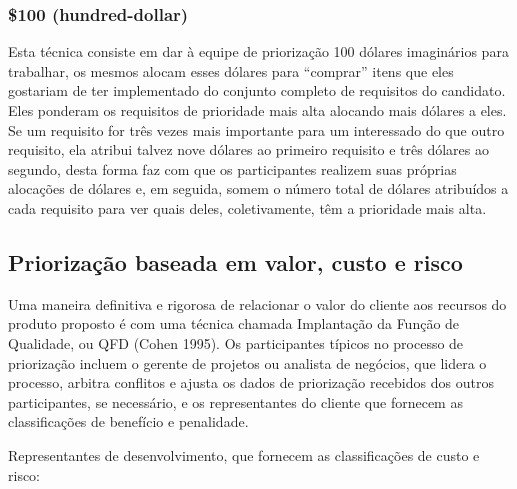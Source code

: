 \documentclass[runningheads]{llncs}
\begin{document}
\subsubsection{\$100 (hundred-dollar)}
Esta técnica consiste em dar à equipe de priorização 100 dólares imaginários para trabalhar, os mesmos alocam esses dólares para “comprar” itens que eles gostariam de ter implementado do conjunto completo de requisitos do candidato. Eles ponderam os requisitos de prioridade mais alta alocando mais dólares a eles. Se um requisito for três vezes mais importante para um interessado do que outro requisito, ela atribui talvez nove dólares ao primeiro requisito e três dólares ao segundo, desta forma faz com que os participantes realizem suas próprias alocações de dólares e, em seguida, somem o número total de dólares atribuídos a cada requisito para ver quais deles, coletivamente, têm a prioridade mais alta.

\subsection{Priorização baseada em valor, custo e risco}

Uma maneira definitiva e rigorosa de relacionar o valor do cliente aos recursos do produto proposto é com uma técnica chamada Implantação da Função de Qualidade, ou QFD (Cohen 1995). 
Os participantes típicos no processo de priorização incluem o gerente de projetos ou analista de negócios, que lidera o processo, arbitra conflitos e ajusta os dados de priorização recebidos dos outros participantes, se necessário, e os representantes do cliente que fornecem as classificações de benefício e penalidade.

Representantes de desenvolvimento, que fornecem as classificações de custo e risco:
\end{document}
